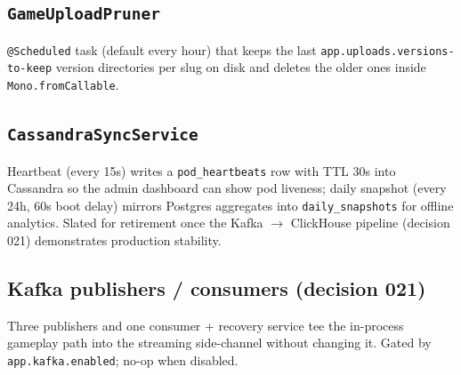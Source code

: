 \subsection{\texttt{GameUploadPruner}}
\texttt{@Scheduled} task (default every hour) that keeps the last
\texttt{app.uploads.versions-to-keep} version directories per slug on
disk and deletes the older ones inside \texttt{Mono.fromCallable}.


\subsection{\texttt{CassandraSyncService}}
Heartbeat (every 15s) writes a \texttt{pod\_heartbeats} row with TTL 30s
into Cassandra so the admin dashboard can show pod liveness; daily
snapshot (every 24h, 60s boot delay) mirrors Postgres aggregates into
\texttt{daily\_snapshots} for offline analytics. Slated for retirement
once the Kafka $\rightarrow$ ClickHouse pipeline (decision 021)
demonstrates production stability.


\subsection{Kafka publishers / consumers (decision 021)}
Three publishers and one consumer + recovery service tee the in-process
gameplay path into the streaming side-channel without changing it.
Gated by \texttt{app.kafka.enabled}; no-op when disabled.

